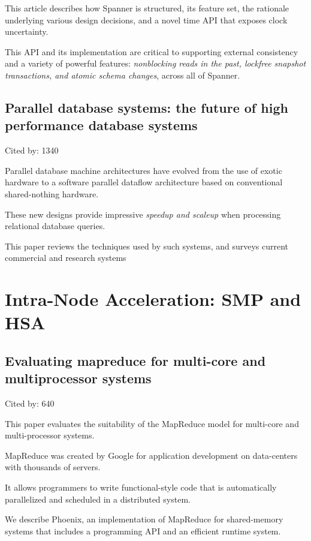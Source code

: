 \documentclass[a4paper,11pt]{article}
\begin{document}
{{{This article 
describes how Spanner is structured, 
its feature set, 
the rationale underlying various design decisions, and 
a novel time API that exposes clock uncertainty. 

This API and its implementation are 
critical to supporting external consistency and a variety of powerful features: 
{\color{red} \em nonblocking reads in the past, lockfree snapshot transactions, and atomic schema changes}, 
across all of Spanner.

}

\subsection*{Parallel database systems: the future of high performance database systems}
{\color{cyan} {\color{magenta} Cited by: 1340}

Parallel database machine architectures have evolved 
from the use of exotic hardware 
to a software parallel dataflow architecture 
based on conventional shared-nothing hardware. 

These new designs 
provide impressive 
{\color{red} \em speedup and scaleup}
when processing relational database queries. 

This paper \cite{pdb}
reviews the techniques used by such systems, and 
surveys current commercial and research systems	

}

\section{Intra-Node Acceleration: SMP and HSA}

\subsection*{Evaluating mapreduce for multi-core and multiprocessor systems}
{\color{cyan} {\color{magenta} Cited by: 640}

This paper 
evaluates the suitability of the MapReduce model 
for multi-core and multi-processor systems. 

MapReduce was created by Google 
for application development
on data-centers with thousands of servers. 

It allows programmers to write functional-style code that is 
automatically parallelized and scheduled in a distributed system.

We describe 
{\color{black} Phoenix\cite{phoenix07}}, 
an implementation of MapReduce 
for shared-memory systems that 
includes a programming API and an efficient runtime system. 

}}}
\end{document}
